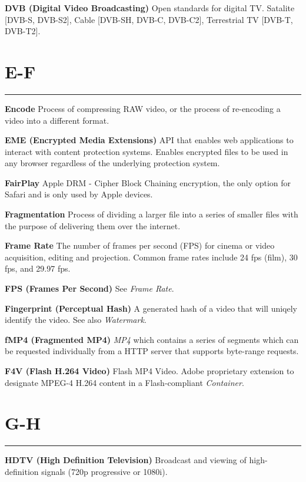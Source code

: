 \smallskip
\textbf{DVB (Digital Video Broadcasting)}
Open standards for digital TV.  Satalite [DVB-S, DVB-S2], Cable [DVB-SH, DVB-C, DVB-C2], Terrestrial TV [DVB-T, DVB-T2].

\section{E-F}
\hrule

\medskip
\textbf{Encode}
Process of compressing RAW video, or the process of re-encoding a video into a different format.

\smallskip
\textbf{EME (Encrypted Media Extensions)}
API that enables web applications to interact with content protection systems. Enables encrypted files to be used in any browser regardless of the underlying protection system.

\smallskip
\textbf{FairPlay}
Apple DRM - Cipher Block Chaining encryption, the only option for Safari and is only used by Apple devices.

\smallskip
\textbf{Fragmentation}
Process of dividing a larger file into a series of smaller files with the purpose of delivering them over the internet.

\textbf{Frame Rate}
The number of frames per second (FPS) for cinema or video acquisition, editing and projection. Common frame rates include 24 fps (film), 30 fps, and 29.97 fps.

\textbf{FPS (Frames Per Second)}
See \textit{Frame Rate}.

\smallskip
\textbf{Fingerprint (Perceptual Hash)}
A generated hash of a video that will uniqely identify the video. See also \textit{Watermark}.

\smallskip
\textbf{fMP4 (Fragmented MP4)}
\textit{MP4} which contains a series of segments which can be requested individually from a HTTP server that supports byte-range requests.

\smallskip
\textbf{F4V (Flash H.264 Video)}
Flash MP4 Video.  Adobe proprietary extension to designate MPEG-4 H.264 content in a Flash-compliant \textit{Container}.

\section{G-H}
\hrule

\medskip
\textbf{HDTV (High Definition Television)}
Broadcast and viewing of high-definition signals (720p progressive or 1080i).

